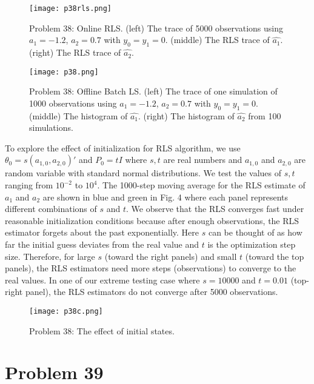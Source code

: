 \documentclass[a4paper, 11pt]{article}
\begin{document}
\begin{figure}
	\begin{center}
		\texttt{[image: p38rls.png]}
		\caption{Problem 38: Online RLS. (left) The trace of 5000 observations using $a_1 = -1.2$, $a_2=0.7$ with $y_0 = y_1 = 0$. (middle) The RLS trace of $\hat{a_1}$. (right) The RLS trace of $\hat{a_2}$.}
	\end{center}
\end{figure}


\begin{figure}
	\begin{center}
		\texttt{[image: p38.png]}
		\caption{Problem 38: Offline Batch LS. (left) The trace of one simulation of 1000 observations using $a_1 = -1.2$, $a_2=0.7$ with $y_0 = y_1 = 0$. (middle) The histogram of $\hat{a_1}$. (right) The histogram of $\hat{a_2}$ from 100 simulations. }
	\end{center}
\end{figure}


To explore the effect of initialization for RLS algorithm, we use $\theta_0 = s(a_{1,0}, a_{2, 0})'$ and $P_0 = tI$ where $s, t$ are real numbers and $a_{1,0}$ and $a_{2,0}$ are random variable with standard normal distributions. We test the values of $s, t$ ranging from $10^{-2}$ to $10^4$. The 1000-step moving average for the RLS estimate of $a_1$ and $a_2$ are shown in blue and green in Fig. 4 where each panel represents different combinations of $s$ and $t$. We observe that the RLS converges fast under reasonable initialization conditions because after enough observations, the RLS estimator forgets about the past exponentially. Here $s$ can be thought of as how far the initial guess deviates from the real value and $t$ is the optimization step size. Therefore, for large $s$ (toward the right panels) and small $t$ (toward the top panels), the RLS estimators need more steps (observations) to converge to the real values. In one of our extreme testing case where $s=10000$ and $t = 0.01$ (top-right panel), the RLS estimators do not converge after 5000 observations. 

\begin{figure}
	\begin{center}
		\texttt{[image: p38c.png]}
		\caption{Problem 38: The effect of initial states. }
	\end{center}
\end{figure}


 

\section*{Problem 39}
\end{document}

